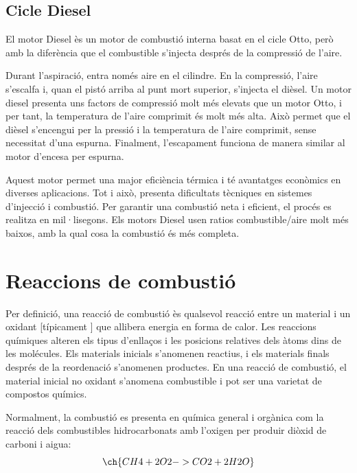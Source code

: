 \subsection{Cicle Diesel}

El motor Diesel \`es un motor de combusti\'o interna basat en el cicle Otto, per\`o amb la difer\`encia que el combustible s'injecta despr\'es de la compressi\'o de l'aire. 

Durant l'aspiraci\'o, entra nom\'es aire en el cilindre. En la compressi\'o, l'aire s'escalfa i, quan el pist\'o arriba al punt mort superior, s'injecta el di\`esel. Un motor diesel presenta uns factors de compressió molt més elevats que un motor Otto, i per tant, la temperatura de l'aire comprimit és molt més alta. Això permet que el dièsel s'encengui per la pressió i la temperatura de l'aire comprimit, sense necessitat d'una espurna. Finalment, l'escapament funciona de manera similar al motor d'encesa per espurna. 

Aquest motor permet una major efici\`encia t\'ermica i t\'e avantatges econ\`omics en diverses aplicacions. Tot i aix\`o, presenta dificultats t\`ecniques en sistemes d'injecci\'o i combusti\'o. Per garantir una combusti\'o neta i eficient, el proc\'es es realitza en mil·lisegons. Els motors Diesel usen ratios combustible/aire molt més baixos, amb la qual cosa la combustió és més completa.





    \section{Reaccions de combustió}

    Per definici\'o, una reacci\'o de combusti\'o \`es qualsevol reacci\'o entre un material i un oxidant [t\'ipicament ] que allibera energia en forma de calor. Les reaccions qu\'imiques alteren els tipus d'enlla\c{c}os i les posicions relatives dels \`atoms dins de les mol\'ecules. Els materials inicials s'anomenen reactius, i els materials finals despr\'es de la reordenaci\'o s'anomenen productes. En una reacci\'o de combusti\'o, el material inicial no oxidant s'anomena combustible i pot ser una varietat de compostos qu\'imics\cite{bowers_understanding_2014}.

Normalment, la combusti\'o es presenta en qu\'imica general i org\`anica com la reacci\'o dels combustibles hidrocarbonats amb l'oxigen per produir di\`oxid de carboni i aigua:
\begin{equation}
\ch{CH4 + 2 O2 -> CO2 + 2 H2O}
\end{equation}

